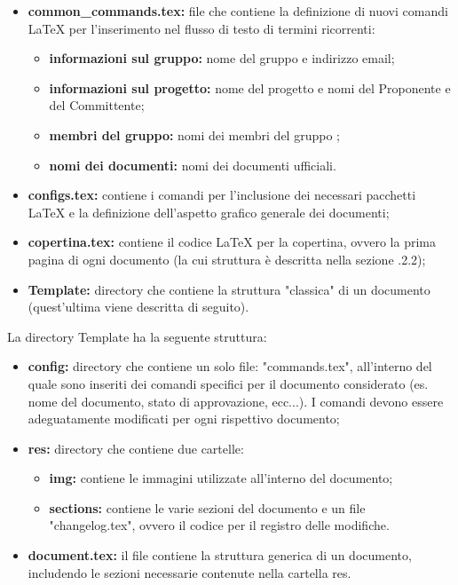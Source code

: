         \begin{itemize}
          \item \textbf{common\_commands.tex:} file che contiene la definizione di nuovi comandi \LaTeX{} per l'inserimento nel flusso di testo di termini ricorrenti:
            \begin{itemize}
              \item \textbf{informazioni sul gruppo:} nome del gruppo e indirizzo email;
              \item \textbf{informazioni sul progetto:} nome del progetto e nomi del Proponente e del Committente;
              \item \textbf{membri del gruppo:} nomi dei membri del gruppo \Gruppo;
              \item \textbf{nomi dei documenti:} nomi dei documenti ufficiali.
            \end{itemize}
          \item \textbf{configs.tex:} contiene i comandi per l'inclusione dei necessari pacchetti \LaTeX{} e la definizione dell'aspetto grafico generale dei documenti;
          \item \textbf{copertina.tex:} contiene il codice \LaTeX{} per la copertina, ovvero la prima pagina di ogni documento (la cui struttura è descritta nella sezione .2.2);
          \item \textbf{Template:} directory che contiene la struttura "classica" di un documento (quest'ultima viene descritta di seguito).
        \end{itemize}
        La directory Template ha la seguente struttura:
        \begin{itemize}
          \item \textbf{config:} directory che contiene un solo file: "commands.tex", all'interno del quale sono inseriti dei comandi specifici per il documento considerato (es. nome del documento, stato di approvazione, ecc...). I comandi devono essere adeguatamente modificati per ogni rispettivo documento;
          \item \textbf{res:} directory che contiene due cartelle:
            \begin{itemize}
              \item \textbf{img:} contiene le immagini utilizzate all'interno del documento;
              \item \textbf{sections:} contiene le varie sezioni del documento e un file "changelog.tex", ovvero il codice per il registro delle modifiche.
            \end{itemize}
          \item \textbf{document.tex:} il file contiene la struttura generica di un documento, includendo le sezioni necessarie contenute nella cartella res.
        \end{itemize}

